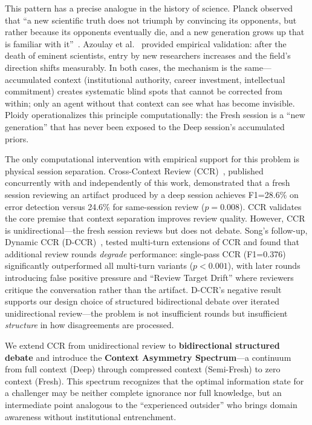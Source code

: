 \documentclass[11pt]{article}
\begin{document}
This pattern has a precise analogue in the history of science. Planck observed that ``a new scientific truth does not triumph by convincing its opponents, but rather because its opponents eventually die, and a new generation grows up that is familiar with it''~\citep{planck1950}. Azoulay et al.~\citep{azoulay2019} provided empirical validation: after the death of eminent scientists, entry by new researchers increases and the field's direction shifts measurably. In both cases, the mechanism is the same---accumulated context (institutional authority, career investment, intellectual commitment) creates systematic blind spots that cannot be corrected from within; only an agent without that context can see what has become invisible. Ploidy operationalizes this principle computationally: the Fresh session is a ``new generation'' that has never been exposed to the Deep session's accumulated priors.

The only computational intervention with empirical support for this problem is physical session separation. Cross-Context Review (CCR)~\citep{song2026ccr}, published concurrently with and independently of this work, demonstrated that a fresh session reviewing an artifact produced by a deep session achieves F1=28.6\% on error detection versus 24.6\% for same-session review ($p=0.008$). CCR validates the core premise that context separation improves review quality. However, CCR is unidirectional---the fresh session reviews but does not debate. Song's follow-up, Dynamic CCR (D-CCR)~\citep{song2026dccr}, tested multi-turn extensions of CCR and found that additional review rounds \emph{degrade} performance: single-pass CCR (F1=0.376) significantly outperformed all multi-turn variants ($p<0.001$), with later rounds introducing false positive pressure and ``Review Target Drift'' where reviewers critique the conversation rather than the artifact. D-CCR's negative result supports our design choice of structured bidirectional debate over iterated unidirectional review---the problem is not insufficient rounds but insufficient \emph{structure} in how disagreements are processed.

We extend CCR from unidirectional review to \textbf{bidirectional structured debate} and introduce the \textbf{Context Asymmetry Spectrum}---a continuum from full context (Deep) through compressed context (Semi-Fresh) to zero context (Fresh). This spectrum recognizes that the optimal information state for a challenger may be neither complete ignorance nor full knowledge, but an intermediate point analogous to the ``experienced outsider'' who brings domain awareness without institutional entrenchment.
\end{document}
